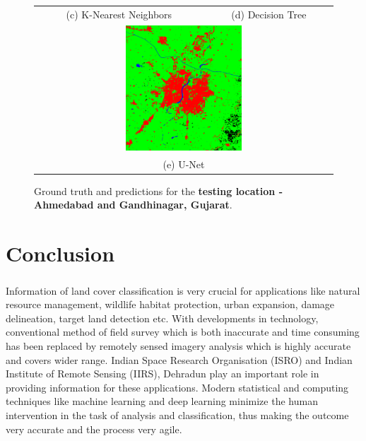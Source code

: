\documentclass[12pt, a4paper]{report}
\begin{document}
\begin{figure}
\begin{center}
\begin{tabular}{cc}
(c) K-Nearest Neighbors & (d) Decision Tree \\[6pt]
\multicolumn{2}{c}{\includegraphics[width=0.4\textwidth]{test_cnn} }\\
\multicolumn{2}{c}{(e) U-Net}
\end{tabular}
\caption{Ground truth and predictions for the \textbf{testing location - Ahmedabad and Gandhinagar, Gujarat}.}
\end{center}
\end{figure}

\chapter{Conclusion}

\paragraph{}
Information of land cover classification is very crucial for applications like natural resource management, wildlife habitat protection, urban expansion, damage delineation, target land detection etc. With developments in technology, conventional method of field survey which is both inaccurate and time consuming has been replaced by remotely sensed imagery analysis which is highly accurate and covers wider range. Indian Space Research Organisation (ISRO) and Indian Institute of Remote Sensing (IIRS), Dehradun play an important role in providing information for these applications. Modern statistical and computing techniques like machine learning and deep learning minimize the human intervention in the task of analysis and classification, thus making the outcome very accurate and the process very agile.
\end{document}
